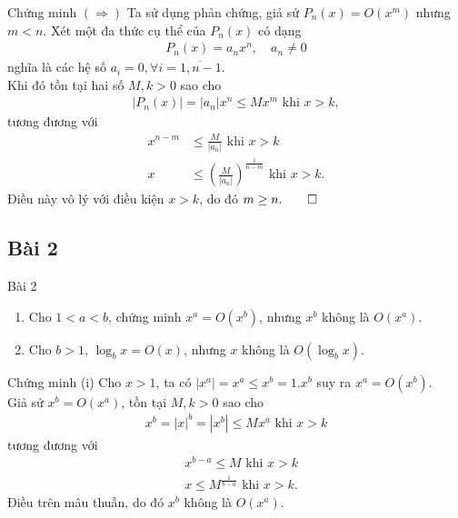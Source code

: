 \documentclass[9pt]{beamer}
\begin{document}
\begin{frame}
    \begin{exampleblock}{Chứng minh}
    $(\Rightarrow)$ Ta sử dụng phản chứng, giả sử $P_n(x) = O(x^m)$ nhưng $m < n$. Xét một đa thức cụ thể của $P_n(x)$ có dạng
    \begin{align*}
        P_n(x) = a_n x^n, \quad a_n \neq 0
    \end{align*}
    nghĩa là các hệ số $a_i = 0, \forall i = \overline{1,n-1}$. \\
    \noindent Khi đó tồn tại hai số $M, k > 0$ sao cho
    \begin{align*}
        |P_n(x)| = |a_n| x^n \le M x^m \text{ khi } x > k,
    \end{align*}
    tương đương với
    \begin{align*}
        x^{n-m} &\le \frac{M}{|a_n|} \text { khi } x > k \\
        x &\le \left(\frac{M}{|a_n|}\right)^{\frac{1}{n-m}} \text { khi } x > k.
    \end{align*}
    Điều này vô lý với điều kiện $x > k$, do đó $m \ge n. \hfill \qed$
    \end{exampleblock}
\end{frame}

\subsection{Bài 2}

\begin{frame}
    \begin{block}{Bài 2}
    \begin{enumerate}[label=(\roman*)]
        \item Cho $1 < a < b$, chứng minh $x^a = O(x^b)$, nhưng $x^b$ không là $O(x^a)$.
        \item Cho $b > 1$, $\log_b x = O(x)$, nhưng $x$ không là $O(\log_b x)$.
    \end{enumerate}
    \end{block}
    
    \begin{exampleblock}{Chứng minh}
    (i) Cho $x > 1$, ta có $|x^a| = x^a \le x^b = 1.x^b$ suy ra $x^a = O(x^b)$. \\
    \noindent Giả sử $x^b = O(x^a)$, tồn tại $M, k > 0$ sao cho
    \begin{align*}
        x^b = |x|^b = |x^b| \le M x^a \text{ khi } x > k
    \end{align*}
    tương đương với
    \begin{align*}
        & x^{b-a} \le M \text{ khi } x > k \\
        & x \le M^{\frac{1}{b-a}} \text{ khi } x > k.
    \end{align*}
    Điều trên mâu thuẫn, do đó $x^b$ không là $O(x^a)$.
    \end{exampleblock}
\end{frame}
\end{document}
